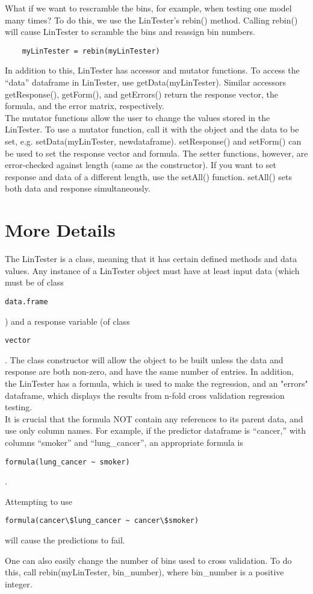 \documentclass[12pt,letterpaper]{article}
\begin{document}
What if we want to rescramble the bins, for example, when testing one model many times? To do this, we use the LinTester's rebin() method. Calling rebin() will
cause LinTester to scramble the bins and reassign bin numbers.

\begin{verbatim}
	myLinTester = rebin(myLinTester)
\end{verbatim}

In addition to this, LinTester has accessor and mutator functions. To access the ``data''
dataframe in LinTester, use getData(myLinTester). Similar accessors getResponse(), 
getForm(), and getErrors() return the response vector, the formula, and the error matrix,
respectively.\\

The mutator functions allow the user to change the values stored in the LinTester. To use a mutator function, call it with the object and the data to be set, e.g. setData(myLinTester, newdataframe). setResponse() and setForm() can be used to set the response vector and formula. The setter functions, however, are error-checked against length (same as the constructor). If you want to set response and data of a different length, use the setAll() function. setAll() sets both data and response simultaneously. 


\section*{More Details}
The LinTester is a class, meaning that it has certain defined methods and data values. 
Any instance of a LinTester object must have at least input data (which must be of class
\begin{verbatim}data.frame\end{verbatim}) and a response variable (of class 
\begin{verbatim}vector\end{verbatim}. The class constructor will allow the object to be
built unless the data and response are both non-zero, and have the same number of entries.
In addition, the LinTester has a formula, which is used to make the regression, and an
"errors" dataframe, which displays the results from n-fold cross validation regression
testing.\\

It is crucial that the formula NOT contain any references to its parent data, 
and use only column names. For example, if the predictor dataframe is 
``cancer,'' with columns ``smoker'' and ``lung\_cancer'', an appropriate formula is

 \begin{verbatim} 
formula(lung_cancer ~ smoker)
\end{verbatim}. 

Attempting to use 
\begin{verbatim} 
formula(cancer\$lung_cancer ~ cancer\$smoker)
\end{verbatim}

will cause the predictions to fail.

One can also easily change the number of bins used to cross validation. To do this, call rebin(myLinTester, bin\_number), where bin\_number is a positive integer.
\end{document}
